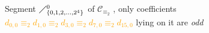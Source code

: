 
\begin{figure}[p]

    \noindent{}

    \captionsetup{singlelinecheck=off}
    \caption[Segment $\diagup_{\lbrace 0,1,2,\ldots,2^{4}\rbrace}^{0}$ of $\mathcal{C}_{\equiv_{2}}$ ]{ 
        Segment $\diagup_{\lbrace 0,1,2,\ldots,2^{4}\rbrace}^{0}$ of $\mathcal{C}_{\equiv_{2}}$ ,
        only coefficients
        \textcolor{orange}{
            $   d_{0,0}\equiv_{2}
                d_{1,0}\equiv_{2}
                d_{3,0}\equiv_{2}
                d_{7,0}\equiv_{2}
                d_{15,0}$} 
                lying on it are \emph{odd}}

    \label{fig:catalan-first-column}

\end{figure}
